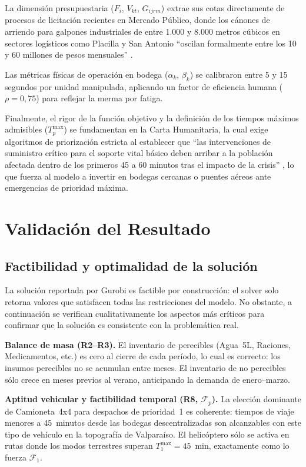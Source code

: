 \documentclass[letterpaper]{article}
\begin{document}
\begin{flushleft}
La dimensi\'on presupuestaria ($F_i$, $V_{kt}$, $G_{ijrm}$) extrae sus cotas directamente de procesos de licitaci\'on recientes en Mercado P\'ublico, donde los c\'anones de arriendo para galpones industriales de entre 1.000 y 8.000 metros c\'ubicos en sectores log\'isticos como Placilla y San Antonio ``oscilan formalmente entre los 10 y 60 millones de pesos mensuales'' \cite{chilecompra2025}.

Las m\'etricas f\'isicas de operaci\'on en bodega ($\alpha_k$, $\beta_k$) se calibraron entre 5 y 15 segundos por unidad manipulada, aplicando un factor de eficiencia humana ($\rho = 0{,}75$) para reflejar la merma por fatiga.

Finalmente, el rigor de la funci\'on objetivo y la definici\'on de los tiempos m\'aximos admisibles ($T^{\max}_p$) se fundamentan en la Carta Humanitaria, la cual exige algoritmos de priorizaci\'on estricta al establecer que ``las intervenciones de suministro cr\'itico para el soporte vital b\'asico deben arribar a la poblaci\'on afectada dentro de los primeros 45 a 60 minutos tras el impacto de la crisis'' \cite{esfera2018}, lo que fuerza al modelo a invertir en bodegas cercanas o puentes a\'ereos ante emergencias de prioridad m\'axima.

\section{Validaci\'on del Resultado}

\subsection{Factibilidad y optimalidad de la soluci\'on}

La soluci\'on reportada por Gurobi es factible por construcci\'on: el solver solo retorna valores que satisfacen todas las restricciones del modelo. No obstante, a continuaci\'on se verifican cualitativamente los aspectos m\'as cr\'iticos para confirmar que la soluci\'on es consistente con la problem\'atica real.

\textbf{Balance de masa (R2--R3).} El inventario de perecibles (Agua~5L, Raciones, Medicamentos, etc.) es cero al cierre de cada per\'iodo, lo cual es correcto: los insumos perecibles no se acumulan entre meses. El inventario de no perecibles s\'olo crece en meses previos al verano, anticipando la demanda de enero--marzo.

\textbf{Aptitud vehicular y factibilidad temporal (R8, $\mathcal{F}_p$).} La elecci\'on dominante de Camioneta~4x4 para despachos de prioridad~1 es coherente: tiempos de viaje menores a 45~minutos desde las bodegas descentralizadas son alcanzables con este tipo de veh\'iculo en la topograf\'ia de Valpara\'iso. El helic\'optero s\'olo se activa en rutas donde los modos terrestres superan $T^{\max}_1=45$~min, exactamente como lo fuerza $\mathcal{F}_1$.


\end{flushleft}
\end{document}
